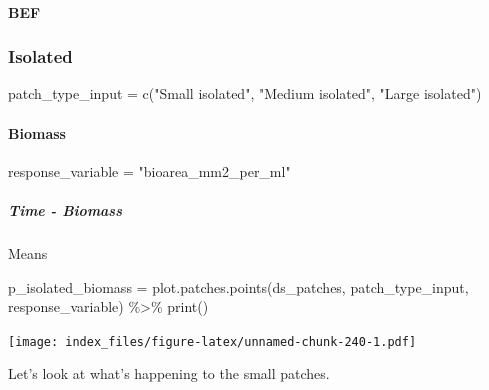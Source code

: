 \documentclass[
]{article}
\newenvironment{Shaded}{\begin{snugshade}}{\end{snugshade}}
\newcommand{\FunctionTok}[1]{\textcolor[rgb]{0.00,0.00,0.00}{#1}}
\newcommand{\NormalTok}[1]{#1}
\newcommand{\OtherTok}[1]{\textcolor[rgb]{0.56,0.35,0.01}{#1}}
\newcommand{\SpecialCharTok}[1]{\textcolor[rgb]{0.00,0.00,0.00}{#1}}
\newcommand{\StringTok}[1]{\textcolor[rgb]{0.31,0.60,0.02}{#1}}
\begin{document}
\hypertarget{bef}{%
\paragraph{BEF}\label{bef}}

\hypertarget{isolated}{%
\subsubsection{Isolated}\label{isolated}}

\begin{Shaded}
\begin{Highlighting}[]
\NormalTok{patch\_type\_input }\OtherTok{=} \FunctionTok{c}\NormalTok{(}\StringTok{"Small isolated"}\NormalTok{,}
                     \StringTok{"Medium isolated"}\NormalTok{,}
                     \StringTok{"Large isolated"}\NormalTok{)}
\end{Highlighting}
\end{Shaded}

\hypertarget{biomass-2}{%
\paragraph{Biomass}\label{biomass-2}}

\begin{Shaded}
\begin{Highlighting}[]
\NormalTok{response\_variable }\OtherTok{=} \StringTok{"bioarea\_mm2\_per\_ml"}
\end{Highlighting}
\end{Shaded}

\hypertarget{time---biomass}{%
\subparagraph{Time - Biomass}\label{time---biomass}}

Means

\begin{Shaded}
\begin{Highlighting}[]
\NormalTok{p\_isolated\_biomass }\OtherTok{=} \FunctionTok{plot.patches.points}\NormalTok{(ds\_patches, }
\NormalTok{                                         patch\_type\_input,}
\NormalTok{                                         response\_variable) }\SpecialCharTok{\%\textgreater{}\%}
  \FunctionTok{print}\NormalTok{()}
\end{Highlighting}
\end{Shaded}

\texttt{[image: index\_files/figure-latex/unnamed-chunk-240-1.pdf]}

Let's look at what's happening to the small patches.
\end{document}
